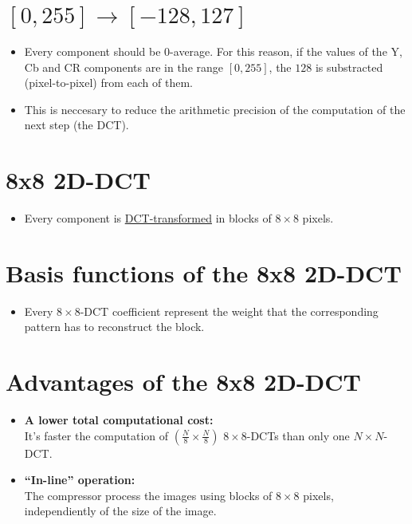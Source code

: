 \section{$[0,255]\rightarrow [-128,127]$}
\begin{itemize}
\item Every component should be 0-average. For this reason, if the
  values of the Y, Cb and CR components are in the range $[0,255]$,
  the $128$ is substracted (pixel-to-pixel) from each of them.
\item This is neccesary to reduce the arithmetic precision of the
  computation of the next step (the DCT).
\end{itemize}

\section{8x8 2D-DCT}
\begin{itemize}
\item Every component is
  \href{http://www.ual.es/~vruiz/docencia/JPEG/index.html#x1-160008}{DCT-transformed}
  in blocks of $8\times 8$ pixels.
\end{itemize}

\section{Basis functions of the 8x8 2D-DCT}
\begin{itemize}
\item Every $8\times 8$-DCT coefficient represent the weight that the
  corresponding pattern has to reconstruct the block.
\end{itemize}
\vspace{-3ex}
\begin{center}
\end{center}

\section{Advantages of the 8x8 2D-DCT}
\begin{itemize}
\item \textbf{A lower total computational cost:}\\ It's faster the
  computation of $(\frac{N}{8}\times \frac{N}{8})$ $8\times 8$-DCTs
  than only one $N\times N$-DCT.
\item \textbf{``In-line'' operation:}\\
  The compressor process the images using blocks of $8\times 8$
  pixels, independiently of the size of the image.
\end{itemize}


